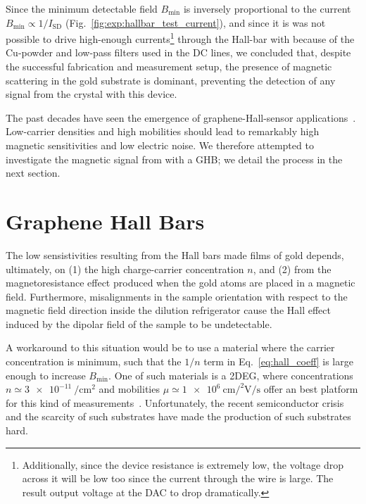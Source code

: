 %
Since the minimum detectable field $B_\textrm{min}$ is inversely proportional to the current $B_\textrm{min}\propto 1/I_\textrm{SD}$ (Fig.~\ref{fig:exp:hallbar_test_current}), and since it is was not possible to drive high-enough currents\footnote[2]{Additionally, since the device resistance is extremely low, the voltage drop across it will be low too since the current through the wire is large. The result output voltage at the \gls{DAC} to drop dramatically.} through the Hall-bar with because of the Cu-powder and low-pass filters used in the DC lines, we concluded that, despite the successful fabrication and measurement setup, the presence of magnetic scattering in the gold substrate is dominant, preventing the detection of any signal from the crystal with this device.

The past decades have seen the emergence of graphene-Hall-sensor applications~\cite{collomb2021frontiers,collomb2019nanoscale}. Low-carrier densities and high mobilities should lead to remarkably high magnetic sensitivities and low electric noise. We therefore attempted to investigate the magnetic signal from  with a \gls{GHB}; we detail the process in the next section.

\section{Graphene Hall Bars}\label{ch:instr_dev:sec:graphene_hall_bar}
The low sensistivities resulting from the Hall bars made films of gold depends, ultimately, on (1) the high charge-carrier concentration $n$, and (2) from the magnetoresistance effect produced when the gold atoms are placed in a magnetic field. Furthermore, misalignments in the sample orientation with respect to the magnetic field direction inside the dilution refrigerator cause the Hall effect induced by the dipolar field of the sample to be undetectable.

A workaround to this situation would be to use a material where the carrier concentration is minimum, such that the $1/n$ term in Eq.~\ref{eq:hall_coeff} is large enough to increase $B_\textrm{min}$. One of such materials is a 2DEG, where concentrations $n\simeq\SI{3e-11}{\per\centi\metre\squared}$ and mobilities $\mu\simeq\SI{1e+6}{\centi\metre\square\per\volt\per\second}$ offer an best platform for this kind of measurements~\cite{candini2007phd}. Unfortunately, the recent semiconductor crisis and the scarcity of such substrates have made the production of such substrates hard.

